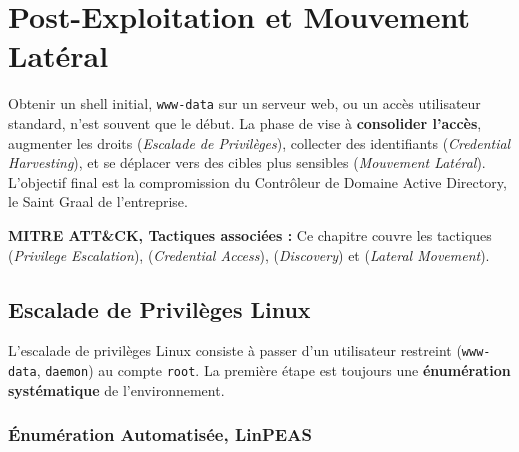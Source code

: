 

\chapter{Post-Exploitation et Mouvement Latéral}
\label{chap:postexploit}

Obtenir un shell initial, \texttt{www-data} sur un serveur web, ou un accès
utilisateur standard, n'est souvent que le début. La phase de
 vise à \textbf{consolider l'accès}, augmenter
les droits (\textit{Escalade de Privilèges}), collecter des identifiants
(\textit{Credential Harvesting}), et se déplacer vers des cibles plus sensibles
(\textit{Mouvement Latéral}). L'objectif final est la compromission du
Contrôleur de Domaine Active Directory, le \og{}Saint Graal\fg{} de
l'entreprise.

\begin{boxinfo}
\textbf{MITRE ATT\&CK, Tactiques associées :}
Ce chapitre couvre les tactiques  (\textit{Privilege
Escalation}),  (\textit{Credential Access}),
 (\textit{Discovery}) et 
(\textit{Lateral Movement}).
\end{boxinfo}

\section{Escalade de Privilèges Linux}
\label{sec:privesc_linux}

L'escalade de privilèges Linux consiste à passer d'un utilisateur restreint
(\texttt{www-data}, \texttt{daemon}) au compte \texttt{root}. La première
étape est toujours une \textbf{énumération systématique} de l'environnement.

\subsection{Énumération Automatisée, LinPEAS}
\label{subsec:linpeas}


